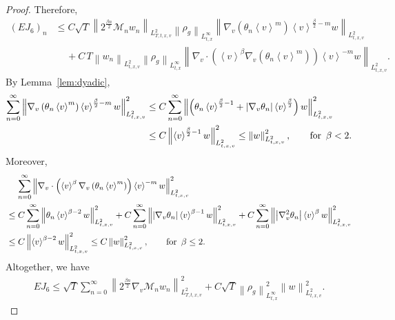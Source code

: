 \documentclass[11pt,american, reqno]{amsart}
\numberwithin{equation}{section}
\newcommand{\1}{\mathds{1}}
\newcommand{\CalM}{\mathcal{M}}
\newcommand{\vpran}[1]{\left(#1\right)}
\newcommand{\norm}[1]{\left\lVert#1\right\rVert}
\newcommand{\abs}[1]{\left\vert#1\right\vert}
\newcommand{\vint}[1]{\left\langle#1\right\rangle}
\numberwithin{equation}{section}
\begin{document}
\begin{proof}
Therefore, 
\begin{align*}
 (EJ_6)_n
&\leq
 C \sqrt{T}
 \norm{2^{\frac{\beta n}{2}}\CalM_n w_n}_{L^2_{T,t,x,v}}
 \norm{\rho_g}_{L^\infty_{t,x}}
 \norm{\nabla_v\vpran{\theta_n \vint{v}^m} \vint{v}^{\frac{\beta}{2}-m}
   w}_{L^2_{t,x,v}}
\\
& \quad \, 
 + C \, T
 \norm{w_n}_{L^2_{t,x,v}}
\norm{\rho_g}_{L^\infty_{t,x}}
\norm{\nabla_v \cdot \vpran{\vint{v}^\beta \nabla_v\vpran{\theta_n \vint{v}^m}} \vint{v}^{-m} w}_{L^2_{t,x,v}}.
\end{align*}
By Lemma~\ref{lem:dyadic}, %
\begin{align*}
 \sum_{n=0}^\infty
 \norm{\nabla_v\vpran{\theta_n \vint{v}^m} \vint{v}^{\frac{\beta}{2}-m}
   w}_{L^2_{t,x,v}}^2
& \leq
 C \sum_{n=0}^\infty
 \norm{\vpran{\theta_n \vint{v}^{\frac{\beta}{2}-1} + |\nabla_v \theta_n| \vint{v}^{\frac{\beta}{2}}}
   w}_{L^2_{t,x,v}}^2
\\
& \leq
 C \norm{\vint{v}^{\frac{\beta}{2} - 1}
   w}_{L^2_{t,x,v}}^2
\leq
 \norm{w}_{L^2_{t,x,v}}^2,
\qquad 
\text{for \,} \beta < 2.
\end{align*}
Moreover, 
\begin{align*}
& \quad \,
\sum_{n=0}^\infty
\norm{\nabla_v \cdot \vpran{\vint{v}^\beta \nabla_v\vpran{\theta_n \vint{v}^m}} \vint{v}^{-m} w}_{L^2_{t,x,v}}^2
\\
& \leq 
C \sum_{n=0}^\infty
\norm{\theta_n \vint{v}^{\beta -2} w}_{L^2_{t,x,v}}^2
+ C \sum_{n=0}^\infty
\norm{\abs{\nabla_v\theta_n} \vint{v}^{\beta -1} w}_{L^2_{t,x,v}}^2
+ C\sum_{n=0}^\infty
\norm{\abs{\nabla_v^2\theta_n} \vint{v}^{\beta} w}_{L^2_{t,x,v}}^2
\\
& \leq 
C \norm{\vint{v}^{\beta -2} w}_{L^2_{t,x,v}}^2
\leq 
C \norm{w}_{L^2_{t,x,v}}^2,
\qquad
\text{for \,} \beta \leq 2.
\end{align*}
Altogether, we have
\begin{align} \label{est:EJ-6}
 EJ_6
\leq
 \sqrt{T} 
 \sum_{n=0}^\infty
 \norm{2^{\frac{\beta n}{2}} \nabla_v \CalM_n w_n}_{L^2_{T,t,x,v}}^2
 + C \sqrt{T} \norm{\rho_g}_{L^\infty_{t,x}}^2
 \norm{w}_{L^2_{t,x,v}}^2. 
\end{align}


\end{proof}
\end{document}
